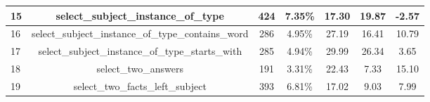 \begin{table}[h!]
{\begin{tabular}{|l|c|cc|cc|c|}
    15                           & select\_subject\_instance\_of\_type                                                                                    & 424                                                 & 7.35\%                                                                          & 17.30                                                                                                      & 19.87                                                                                  & \textbf{-2.57}                                                                     \\ \hline
    16                           & select\_subject\_instance\_of\_type\_contains\_word                                                                    & 286                                                 & 4.95\%                                                                          & 27.19                                                                                                      & 16.41                                                                                  & 10.79                                                                              \\ \hline
    17                           & select\_subject\_instance\_of\_type\_starts\_with                                                                      & 285                                                 & 4.94\%                                                                          & 29.99                                                                                                      & 26.34                                                                                  & 3.65                                                                               \\ \hline
    18                           & select\_two\_answers                                                                                                   & 191                                                 & 3.31\%                                                                          & 22.43                                                                                                      & 7.33                                                                                   & 15.10                                                                              \\ \hline
    19                           & select\_two\_facts\_left\_subject                                                                                      & 393                                                 & 6.81\%                                                                          & 17.02                                                                                                      & 9.03                                                                                   & 7.99                                                                               \\ \hline

\end{tabular}}
\end{table}
